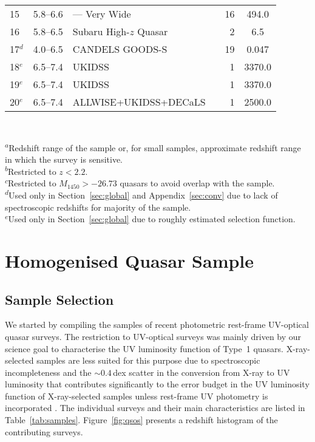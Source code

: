 \documentclass[fleqn,usenatbib]{mnras}
\begin{document}
\begin{table*}
\begin{tabular}{lcllrS}
    15 & 5.8--6.6 & --- Very Wide & \citet{2010AJ....139..906W} & 16 & 494.0 \\
    16 & 5.8--6.5 & Subaru High-$z$ Quasar & \citet{2015ApJ...798...28K} & 2 & 6.5 \\
    17$^d$ &4.0--6.5 & CANDELS GOODS-S & \citet{2015AA...578A..83G} & 19 & 0.047 \\
    18$^e$ & 6.5--7.4 & UKIDSS & \citet{2011Natur.474..616M} & 1 & 3370.0 \\
    19$^e$ & 6.5--7.4 & UKIDSS & \citet{2015ApJ...801L..11V} & 1 & 3370.0 \\
    20$^e$ & 6.5--7.4 & ALLWISE+UKIDSS+DECaLS & \citet{2018Natur.553..473B} & 1 & 2500.0 \\
    \hline
  \end{tabular}\\
  \begin{minipage}{14.5cm}
    \textsuperscript{$a$}{Redshift range of the sample or, for small
      samples, approximate redshift range in which the survey is
      sensitive.}\\
    \textsuperscript{$b$}{Restricted to $z<2.2$.}\\
    \textsuperscript{$c$}{Restricted to $M_{1450}>-26.73$ quasars to
      avoid overlap with the \citet{2016ApJ...829...33Y} sample.}\\
    \textsuperscript{$d$}{Used only in Section~\ref{sec:global} and
      Appendix~\ref{sec:conv} due to lack of spectroscopic redshifts
      for majority of the sample.}\\
    \textsuperscript{$e$}{Used only in Section~\ref{sec:global} due to
      roughly estimated selection function.}
 \end{minipage}
\end{table*}

\section{Homogenised Quasar Sample}
\label{sec:sample}

\subsection{Sample Selection}
\label{sect:samplesel}

We started by compiling the samples of recent photometric rest-frame UV-optical
quasar surveys. The restriction to UV-optical surveys was mainly
driven by our science goal to characterise the UV luminosity function
of Type~1 quasars. X-ray-selected samples are less suited for this
purpose due to spectroscopic incompleteness and the $\sim 0.4$\,dex
scatter in the conversion from X-ray to UV luminosity
\citep{2010A&A...512A..34L, 2015MNRAS.453.1946G, 2016ApJ...819..154L}
that contributes significantly to the error budget in the UV
luminosity function of X-ray-selected samples unless rest-frame UV
photometry is incorporated \citep{2015AA...578A..83G}.  The individual
surveys and their main characteristics are listed in
Table~\ref{tab:samples}.  Figure~\ref{fig:qsos} presents a redshift
histogram of the contributing surveys.
\end{document}
